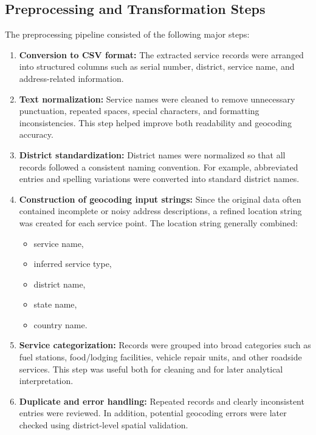 \subsection{Preprocessing and Transformation Steps}

The preprocessing pipeline consisted of the following major steps:

\begin{enumerate}
    \item \textbf{Conversion to CSV format:} The extracted service records were arranged into structured columns such as serial number, district, service name, and address-related information.

    \item \textbf{Text normalization:} Service names were cleaned to remove unnecessary punctuation, repeated spaces, special characters, and formatting inconsistencies. This step helped improve both readability and geocoding accuracy.

    \item \textbf{District standardization:} District names were normalized so that all records followed a consistent naming convention. For example, abbreviated entries and spelling variations were converted into standard district names.

    \item \textbf{Construction of geocoding input strings:} Since the original data often contained incomplete or noisy address descriptions, a refined location string was created for each service point. The location string generally combined:
    \begin{itemize}
        \item service name,
        \item inferred service type,
        \item district name,
        \item state name,
        \item country name.
    \end{itemize}

    \item \textbf{Service categorization:} Records were grouped into broad categories such as fuel stations, food/lodging facilities, vehicle repair units, and other roadside services. This step was useful both for cleaning and for later analytical interpretation.

    \item \textbf{Duplicate and error handling:} Repeated records and clearly inconsistent entries were reviewed. In addition, potential geocoding errors were later checked using district-level spatial validation.
\end{enumerate}

